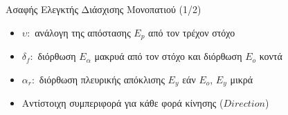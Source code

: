 \documentclass[10pt, compress]{beamer}
\begin{document}
\begin{frame}{Ασαφής Ελεγκτής Διάσχισης Μονοπατιού (1/2)}
	\begin{figure}
		\hspace{1cm}
	\end{figure}
	
	\begin{itemize}
		\item $\upsilon:$ ανάλογη της απόστασης $E_p$ από τον τρέχον στόχο
		\item $\delta_f:$ διόρθωση $E_\alpha$ μακρυά από τον στόχο και διόρθωση $E_o$ κοντά
		\item $\alpha_r:$ διόρθωση πλευρικής απόκλισης $E_y$ εάν $E_o$, $E_y$ μικρά
		\item Αντίστοιχη συμπεριφορά για κάθε φορά κίνησης ($Direction$)
	\end{itemize}
\end{frame}
\end{document}
